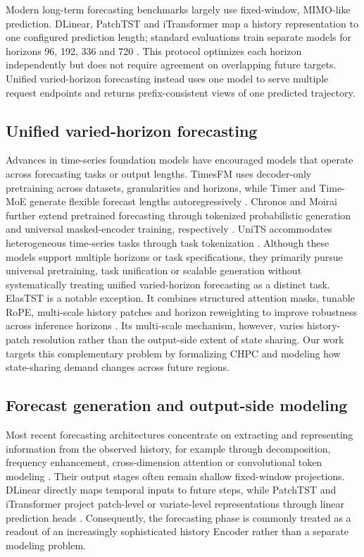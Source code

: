 \documentclass[final,3p,times]{elsarticle}
\begin{document}
Modern long-term forecasting benchmarks largely use fixed-window, MIMO-like prediction. DLinear, PatchTST and iTransformer map a history representation to one configured prediction length; standard evaluations train separate models for horizons 96, 192, 336 and 720 \citep{zeng2023dlinear,nie2023patchtst,liu2024itransformer}. This protocol optimizes each horizon independently but does not require agreement on overlapping future targets. Unified varied-horizon forecasting instead uses one model to serve multiple request endpoints and returns prefix-consistent views of one predicted trajectory.

\subsection{Unified varied-horizon forecasting}


Advances in time-series foundation models have encouraged models that operate across forecasting tasks or output lengths. TimesFM uses decoder-only pretraining across datasets, granularities and horizons, while Timer and Time-MoE generate flexible forecast lengths autoregressively \citep{das2024timesfm,liu2024timer,shi2025timemoe}. Chronos and Moirai further extend pretrained forecasting through tokenized probabilistic generation and universal masked-encoder training, respectively \citep{ansari2024chronos,woo2024moirai}. UniTS accommodates heterogeneous time-series tasks through task tokenization \citep{gao2024units}. Although these models support multiple horizons or task specifications, they primarily pursue universal pretraining, task unification or scalable generation without systematically treating unified varied-horizon forecasting as a distinct task. ElasTST is a notable exception. It combines structured attention masks, tunable RoPE, multi-scale history patches and horizon reweighting to improve robustness across inference horizons \citep{zhang2024elastst}. Its multi-scale mechanism, however, varies history-patch resolution rather than the output-side extent of state sharing. Our work targets this complementary problem by formalizing CHPC and modeling how state-sharing demand changes across future regions.

\subsection{Forecast generation and output-side modeling}


Most recent forecasting architectures concentrate on extracting and representing information from the observed history, for example through decomposition, frequency enhancement, cross-dimension attention or convolutional token modeling \citep{wu2021autoformer,zhou2022fedformer,liu2022nonstationary,zhang2023crossformer,luo2024moderntcn}. Their output stages often remain shallow fixed-window projections. DLinear directly maps temporal inputs to future steps, while PatchTST and iTransformer project patch-level or variate-level representations through linear prediction heads \citep{zeng2023dlinear,nie2023patchtst,liu2024itransformer}. Consequently, the forecasting phase is commonly treated as a readout of an increasingly sophisticated history Encoder rather than a separate modeling problem.
\end{document}
